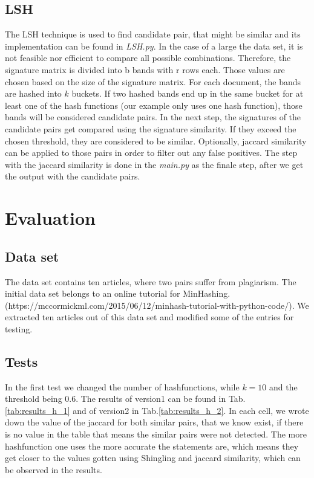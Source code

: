 \documentclass[a4paper, 11pt]{article}
\begin{document}
\subsection{LSH}
 The LSH technique is used to find candidate pair, that might be similar and its implementation can be found in \textit{LSH.py}. In the case of a large the data set, it is not feasible nor efficient to compare all possible combinations. Therefore, the signature matrix is divided into b bands with r rows each. Those values are chosen based on the size of the signature matrix. For each document, the bands are hashed into $k$ buckets. If two hashed bands end up in the same bucket for at least one of the hash functions (our example only uses one hash function), those bands will be considered candidate pairs. In the next step, the signatures of the candidate pairs get compared using the signature similarity. If they exceed the chosen threshold, they are considered to be similar. Optionally, jaccard similarity can be applied to those pairs in order to filter out any false positives. The step with the jaccard similarity is done in the \textit{main.py} as the finale step, after we get the output with the candidate pairs.



\section{Evaluation}

\subsection{Data set}
The data set contains ten articles, where two pairs suffer from plagiarism. The initial data set belongs to an online tutorial for MinHashing.  (https://mccormickml.com/2015/06/12/minhash-tutorial-with-python-code/). We extracted ten articles out of this data set and modified some of the entries for testing.  

\subsection{Tests}

In the first test we changed the number of hashfunctions, while $k=10$ and the threshold being 0.6. The results of version1 can be found in Tab.\ref{tab:results_h_1} and of version2 in Tab.\ref{tab:results_h_2}. In each cell, we wrote down the value of the jaccard for both similar pairs, that we know exist, if there is no value in the table that means the similar pairs were not detected.  The more hashfunction one uses the more accurate the statements are, which means they get closer to the values gotten using Shingling and jaccard similarity, which can be observed in the results.
\end{document}
